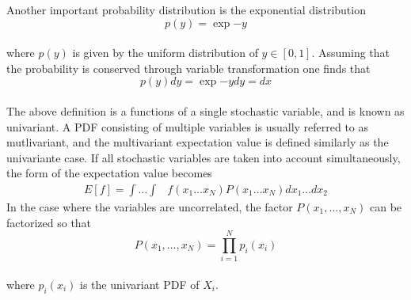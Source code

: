 \documentclass[%
reprint,
amsmath,amssymb,
aps,
]{revtex4-1}
\begin{document}
Another important probability distribution is the exponential distribution \vspace{2mm} \\ 
\begin{equation}\label{exppdf}
	p(y) = \exp{-y}
\end{equation} \\
where $p(y)$ is given by the uniform distribution of $y\in[0,1]$. Assuming that the probability is conserved through variable transformation one finds that  \vspace{2mm}\\
\begin{equation*}
p(y)dy = \exp{-y}dy = dx
\end{equation*} \\ 
The above definition is a functions of a single stochastic variable, and is  known as univariant. A PDF consisting of multiple variables is usually referred to as mutlivariant, and the multivariant expectation value is defined similarly as the univariante case. If all stochastic variables are taken into account simultaneously, the form of the expectation value becomes\vspace{2mm} 
\begin{align*}
	E[f] =  \int\dots\int &f(x_1\dots x_N)P(x_1\dots x_N)dx_1\dots dx_2
\end{align*}
In the case where the variables are uncorrelated, the factor $P(x_1,...,x_N)$ can be factorized so that \\
\begin{equation*}
	P(x_1,\dots,x_N) = \prod_{i = 1}^{N} p_i(x_i)
\end{equation*} \\
where $p_i(x_i)$ is the univariant PDF of $X_i$. \vspace{2mm}
\end{document}
